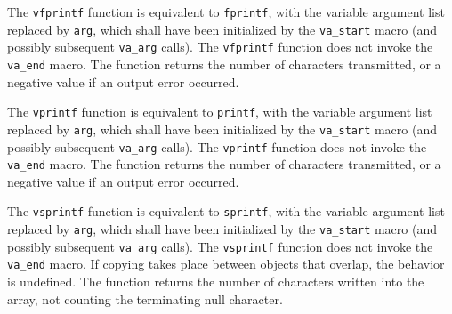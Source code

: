The \texttt{vfprintf} function is equivalent to \texttt{fprintf}, with the
variable argument list replaced by \texttt{arg}, which shall have been
initialized by the \texttt{va\_start} macro (and possibly subsequent
\texttt{va\_arg} calls). The \texttt{vfprintf} function does not invoke the
\texttt{va\_end} macro. The function returns the number of characters
transmitted, or a negative value if an output error occurred.

The \texttt{vprintf} function is equivalent to \texttt{printf}, with the
variable argument list replaced by \texttt{arg}, which shall have been
initialized by the \texttt{va\_start} macro (and possibly subsequent
\texttt{va\_arg} calls). The \texttt{vprintf} function does not invoke the
\texttt{va\_end} macro. The function returns the number of characters
transmitted, or a negative value if an output error occurred.

The \texttt{vsprintf} function is equivalent to \texttt{sprintf}, with the
variable argument list replaced by \texttt{arg}, which shall have been
initialized by the \texttt{va\_start} macro (and possibly subsequent
\texttt{va\_arg} calls). The \texttt{vsprintf} function does not invoke the
\texttt{va\_end} macro. If copying takes place between objects that overlap,
the behavior is undefined. The function returns the number of characters
written into the array, not counting the terminating null character.
